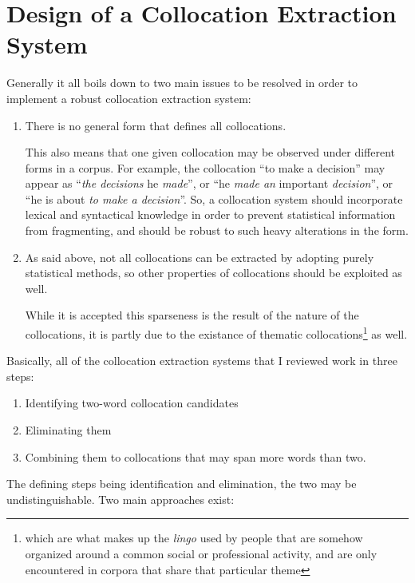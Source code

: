 \documentclass[a4paper,12pt,oneside]{article}
\begin{document}
\section{Design of a Collocation Extraction System}
Generally it all boils down to two main issues to be resolved in order to implement a robust collocation extraction system:
\begin{enumerate}
\item There is no general form that defines all collocations. 

      This also means that one given collocation may be observed under different forms in a corpus. 
      For example, the collocation ``to make a decision'' may appear as ``\textit{the decisions} he \textit{made}'', or ``he \textit{made an} important \textit{decision}'', or ``he is about \textit{to make a decision}''. 
      So, a collocation system should incorporate lexical and syntactical knowledge in order to prevent statistical information from fragmenting, and should be robust to such heavy alterations in the form.
\item As said above, not all collocations can be extracted by adopting purely statistical methods, so other properties of collocations should be exploited as well.

      While it is accepted this sparseness is the result of the nature of the collocations, it is partly due to the existance of thematic collocations\footnote{which are what makes up the \emph{lingo} used by people that are somehow organized around a common social or professional activity, and are only encountered in corpora that share that particular theme} as well.
\end{enumerate}

Basically, all of the collocation extraction systems that I reviewed work in three steps:
\begin{enumerate}
\item Identifying two-word collocation candidates
\item Eliminating them
\item Combining them to collocations that may span more words than two.
\end{enumerate}

The defining steps being identification and elimination, the two may be undistinguishable. Two main approaches exist:
\end{document}
